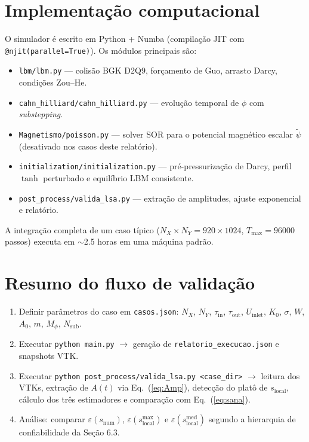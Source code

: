 \documentclass[11pt,a4paper]{article}
\begin{document}
\section{Implementação computacional}

O simulador é escrito em Python + Numba (compilação JIT com
\texttt{@njit(parallel=True)}). Os módulos principais são:
\begin{itemize}
    \item \texttt{lbm/lbm.py} --- colisão BGK D2Q9, forçamento de Guo,
    arrasto Darcy, condições Zou--He.
    \item \texttt{cahn\_hilliard/cahn\_hilliard.py} --- evolução temporal
    de $\phi$ com \textit{substepping}.
    \item \texttt{Magnetismo/poisson.py} --- solver SOR para o
    potencial magnético escalar $\widetilde{\psi}$ (desativado nos casos
    deste relatório).
    \item \texttt{initialization/initialization.py} ---
    pré-pressurização de Darcy, perfil $\tanh$ perturbado e equilíbrio
    LBM consistente.
    \item \texttt{post\_process/valida\_lsa.py} --- extração de
    amplitudes, ajuste exponencial e relatório.
\end{itemize}

A integração completa de um caso típico ($N_X\!\times\!N_Y = 920\!\times\!1024$,
$T_{\max} = \num{96000}$ passos) executa em $\sim$\num{2.5} horas em uma
máquina padrão.

\section{Resumo do fluxo de validação}

\begin{enumerate}
    \item Definir parâmetros do caso em \texttt{casos.json}:
    $N_X$, $N_Y$, $\tau_{\mathrm{in}}$, $\tau_{\mathrm{out}}$,
    $U_{\mathrm{inlet}}$, $K_0$, $\sigma$, $W$, $A_0$, $m$,
    $M_\phi$, $N_{\mathrm{sub}}$.

    \item Executar \texttt{python main.py} $\rightarrow$ geração de
    \texttt{relatorio\_execucao.json} e snapshots VTK.

    \item Executar \texttt{python post\_process/valida\_lsa.py <case\_dir>}
    $\rightarrow$ leitura dos VTKs, extração de $A(t)$ via Eq.\
    (\ref{eq:Amp}), detecção do platô de $s_{\mathrm{local}}$, cálculo
    dos três estimadores e comparação com Eq.\ (\ref{eq:sana}).

    \item Análise: comparar $\varepsilon(s_{\mathrm{num}})$,
    $\varepsilon(s_{\mathrm{local}}^{\max})$ e
    $\varepsilon(s_{\mathrm{local}}^{\mathrm{med}})$ segundo a hierarquia
    de confiabilidade da Seção 6.3.
\end{enumerate}
\end{document}
